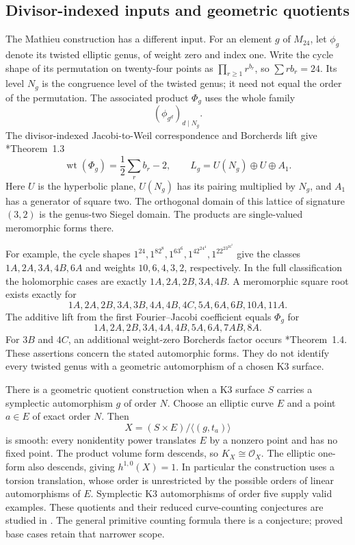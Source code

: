 \subsection{Divisor-indexed inputs and geometric quotients}

The Mathieu construction has a different input. For an
element \(g\) of \(M_{24}\), let \(\phi_g\) denote its
twisted elliptic genus, of weight zero and index one.
Write the cycle shape of its permutation on twenty-four
points as \(\prod_{r\geq1}r^{b_r}\), so
\(\sum r b_r=24\). Its level \(N_g\) is the congruence
level of the twisted genus; it need not equal the order
of the permutation. The associated product \(\Phi_g\)
uses the whole family
\[
             (\phi_{g^d})_{d\mid N_g}.
\]
The divisor-indexed Jacobi-to-Weil correspondence and
Borcherds lift give \cite{WangWilliamsMathieu}*{Theorem~1.3}
\begin{equation}\label{cyidx:eq:Mathieu-weight}
 \operatorname{wt}(\Phi_g)=\frac12\sum_r b_r-2,
 \qquad L_g=U(N_g)\oplus U\oplus A_1.
\end{equation}
Here \(U\) is the hyperbolic plane, \(U(N_g)\) has
its pairing multiplied by \(N_g\), and \(A_1\)
has a generator of square two. The orthogonal domain
of this lattice of signature \((3,2)\) is the genus-two
Siegel domain. The products are single-valued
meromorphic forms there.

For example, the cycle shapes
\(1^{24},1^82^8,1^63^6,1^42^24^4,1^22^23^26^2\)
give the classes \(1A,2A,3A,4B,6A\) and weights
\(10,6,4,3,2\), respectively. In the full classification
the holomorphic cases are exactly
\(1A,2A,2B,3A,4B\). A meromorphic square root exists
exactly for
\[
 1A,2A,2B,3A,3B,4A,4B,4C,5A,6A,6B,10A,11A.
\]
The additive lift from the first Fourier--Jacobi coefficient
equals \(\Phi_g\) for
\[
                1A,2A,2B,3A,4A,4B,5A,6A,7AB,8A.
\]
For \(3B\) and \(4C\), an additional weight-zero
Borcherds factor occurs \cite{WangWilliamsMathieu}*{Theorem~1.4}.
These assertions concern the stated automorphic forms.
They do not identify every twisted genus with a geometric
automorphism of a chosen K3 surface.

There is a geometric quotient construction when a K3
surface \(S\) carries a symplectic automorphism \(g\)
of order \(N\). Choose an elliptic curve \(E\) and a
point \(a\in E\) of exact order \(N\). Then
\begin{equation}\label{cyidx:eq:CHL}
       X=(S\times E)/\langle(g,t_a)\rangle
\end{equation}
is smooth: every nonidentity power translates \(E\)
by a nonzero point and has no fixed point. The product
volume form descends, so \(K_X\cong\mathcal O_X\).
The elliptic one-form also descends, giving
\(h^{1,0}(X)=1\). In particular the construction uses
a torsion translation, whose order is unrestricted by
the possible orders of linear automorphisms of \(E\).
Symplectic K3 automorphisms of order five supply valid
examples. These quotients and their reduced curve-counting
conjectures are studied in \cite{BryanOberdieckCHL}.
The general primitive counting formula there is a
conjecture; proved base cases retain that narrower scope.

